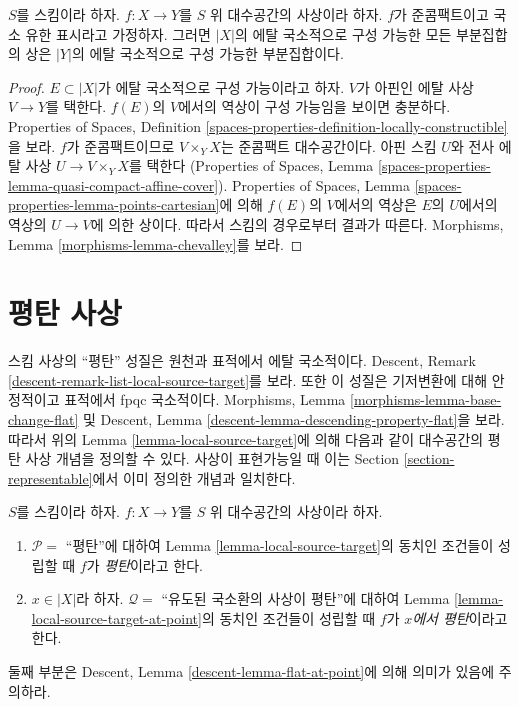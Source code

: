 \begin{theorem}[슈발레 정리]
\label{theorem-chevalley}
$S$를 스킴이라 하자.
$f : X \to Y$를 $S$ 위 대수공간의 사상이라 하자.
$f$가 준콤팩트이고 국소 유한 표시라고 가정하자.
그러면 $|X|$의 에탈 국소적으로 구성 가능한 모든 부분집합의 상은
$|Y|$의 에탈 국소적으로 구성 가능한 부분집합이다.
\end{theorem}

\begin{proof}
$E \subset |X|$가 에탈 국소적으로 구성 가능이라고 하자.
$V$가 아핀인 에탈 사상 $V \to Y$를 택한다.
$f(E)$의 $V$에서의 역상이 구성 가능임을 보이면 충분하다.
Properties of Spaces, Definition
\ref{spaces-properties-definition-locally-constructible}을 보라.
$f$가 준콤팩트이므로 $V \times_Y X$는 준콤팩트 대수공간이다.
아핀 스킴 $U$와 전사 에탈 사상 $U \to V \times_Y X$를 택한다
(Properties of Spaces, Lemma
\ref{spaces-properties-lemma-quasi-compact-affine-cover}).
Properties of Spaces, Lemma
\ref{spaces-properties-lemma-points-cartesian}에 의해
$f(E)$의 $V$에서의 역상은 $E$의 $U$에서의 역상의
$U \to V$에 의한 상이다.
따라서 스킴의 경우로부터 결과가 따른다.
Morphisms, Lemma \ref{morphisms-lemma-chevalley}를 보라.
\end{proof}

\section{평탄 사상}
\label{section-flat}

\noindent
스킴 사상의 “평탄” 성질은 원천과 표적에서 에탈 국소적이다.
Descent, Remark \ref{descent-remark-list-local-source-target}를 보라.
또한 이 성질은 기저변환에 대해 안정적이고 표적에서 fpqc 국소적이다.
Morphisms, Lemma \ref{morphisms-lemma-base-change-flat} 및
Descent, Lemma \ref{descent-lemma-descending-property-flat}을 보라.
따라서 위의 Lemma \ref{lemma-local-source-target}에 의해 다음과 같이
대수공간의 평탄 사상 개념을 정의할 수 있다. 사상이 표현가능일 때 이는
Section \ref{section-representable}에서 이미 정의한 개념과 일치한다.

\begin{definition}
\label{definition-flat}
$S$를 스킴이라 하자.
$f : X \to Y$를 $S$ 위 대수공간의 사상이라 하자.
\begin{enumerate}
\item $\mathcal{P} =$ “평탄”에 대하여 Lemma
\ref{lemma-local-source-target}의 동치인 조건들이 성립할 때
$f$가 {\it 평탄}이라고 한다.
\item $x \in |X|$라 하자. $\mathcal{Q} =$ “유도된 국소환의 사상이
평탄”에 대하여 Lemma \ref{lemma-local-source-target-at-point}의
동치인 조건들이 성립할 때 $f$가 {\it $x$에서 평탄}이라고 한다.
\end{enumerate}
둘째 부분은 Descent, Lemma
\ref{descent-lemma-flat-at-point}에 의해 의미가 있음에 주의하라.
\end{definition}

